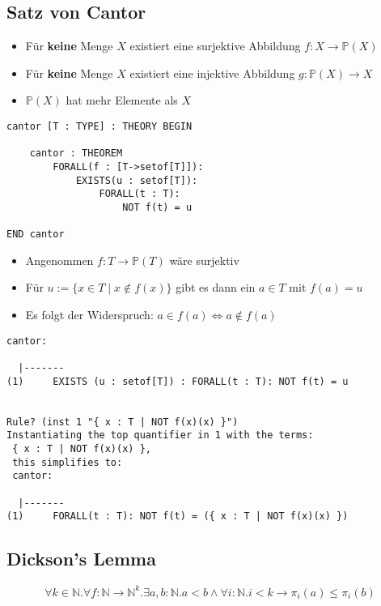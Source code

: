 \documentclass{scrartcl}
\begin{document}
\subsection{Satz von Cantor}

\begin{itemize}
	\item Für \textbf{keine} Menge $ X $ existiert eine surjektive Abbildung $ f : X \rightarrow \mathbb{P}(X) $
	\item Für \textbf{keine} Menge $ X $ existiert eine injektive Abbildung $ g : \mathbb{P}(X) \rightarrow X $
	\item $ \mathbb{P}(X) $ hat mehr Elemente als $ X $
\end{itemize}


\begin{lstlisting}
cantor [T : TYPE] : THEORY BEGIN

	cantor : THEOREM
		FORALL(f : [T->setof[T]]):
			EXISTS(u : setof[T]):
				FORALL(t : T):
					NOT f(t) = u

END cantor
\end{lstlisting}

\begin{itemize}
	\item Angenommen $ f : T \rightarrow \mathbb{P}(T) $ wäre surjektiv
	\item Für $ u := \{ x \in T \mid x \not \in f(x) \} $ gibt es dann ein $ a \in T $ mit $ f(a) = u $
	\item Es folgt der Widerspruch: $ a \in f(a) \iff a \not \in f(a) $
\end{itemize}

\begin{lstlisting}
cantor:

  |-------
(1)		EXISTS (u : setof[T]) : FORALL(t : T): NOT f(t) = u


Rule? (inst 1 "{ x : T | NOT f(x)(x) }")
Instantiating the top quantifier in 1 with the terms:
 { x : T | NOT f(x)(x) },
 this simplifies to:
 cantor:
 
  |-------
(1)		FORALL(t : T): NOT f(t) = ({ x : T | NOT f(x)(x) })
\end{lstlisting}

\subsection{Dickson's Lemma}

\begin{equation*}
	\forall k \in \mathbb{N}. \forall f : \mathbb{N} \rightarrow \mathbb{N}^k .\exists a,b : \mathbb{N} .a < b \wedge \forall i : \mathbb{N} .i < k \rightarrow \pi_i(a) \leq \pi_i(b)
\end{equation*}
\end{document}
